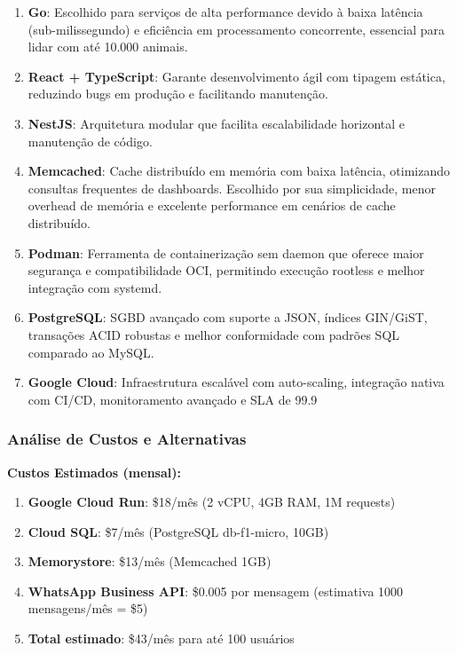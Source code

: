 \documentclass[12pt, a4paper]{article}
\begin{document}
\begin{spacing}{1.5}
\begin{spacing}{1.5}
\begin{enumerate}[label=\alph*)]
\item \textbf{Go}: Escolhido para serviços de alta performance devido à baixa latência (sub-milissegundo) e eficiência em processamento concorrente, essencial para lidar com até 10.000 animais.
\item \textbf{React + TypeScript}: Garante desenvolvimento ágil com tipagem estática, reduzindo bugs em produção e facilitando manutenção.
\item \textbf{NestJS}: Arquitetura modular que facilita escalabilidade horizontal e manutenção de código.
\item \textbf{Memcached}: Cache distribuído em memória com baixa latência, otimizando consultas frequentes de dashboards. Escolhido por sua simplicidade, menor overhead de memória e excelente performance em cenários de cache distribuído.
\item \textbf{Podman}: Ferramenta de containerização sem daemon que oferece maior segurança e compatibilidade OCI, permitindo execução rootless e melhor integração com systemd.
\item \textbf{PostgreSQL}: SGBD avançado com suporte a JSON, índices GIN/GiST, transações ACID robustas e melhor conformidade com padrões SQL comparado ao MySQL.
\item \textbf{Google Cloud}: Infraestrutura escalável com auto-scaling, integração nativa com CI/CD, monitoramento avançado e SLA de 99.9%
\end{enumerate}
\end{spacing}

\subsubsection{Análise de Custos e Alternativas}
\begin{spacing}{1.5}
\textbf{Custos Estimados (mensal):}
\begin{enumerate}[label=\alph*)]
\item \textbf{Google Cloud Run}: \$18/mês (2 vCPU, 4GB RAM, 1M requests)
\item \textbf{Cloud SQL}: \$7/mês (PostgreSQL db-f1-micro, 10GB)
\item \textbf{Memorystore}: \$13/mês (Memcached 1GB)
\item \textbf{WhatsApp Business API}: \$0.005 por mensagem (estimativa 1000 mensagens/mês = \$5)
\item \textbf{Total estimado}: \$43/mês para até 100 usuários
\end{enumerate}


\end{spacing}
\end{spacing}
\end{document}
